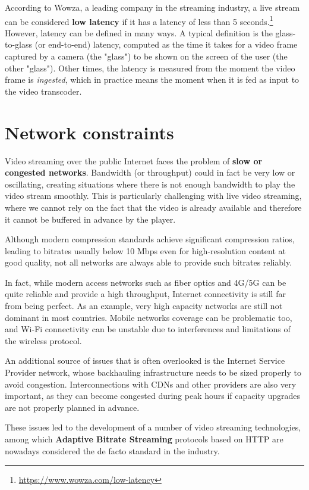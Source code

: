According to Wowza, a leading company in the streaming industry, a live stream can be considered \textbf{low latency} if it has a latency of less than 5 seconds.\footnote{\url{https://www.wowza.com/low-latency}} However, latency can be defined in many ways. A typical definition is the glass-to-glass (or end-to-end) latency, computed as the time it takes for a video frame captured by a camera (the "glass") to be shown on the screen of the user (the other "glass"). Other times, the latency is measured from the moment the video frame is \textit{ingested}, which in practice means the moment when it is fed as input to the video transcoder.

\section{Network constraints}
\label{sec:intro/networks}

Video streaming over the public Internet faces the problem of \textbf{slow or congested networks}. Bandwidth (or throughput) could in fact be very low or oscillating, creating situations where there is not enough bandwidth to play the video stream smoothly. This is particularly challenging with live video streaming, where we cannot rely on the fact that the video is already available and therefore it cannot be buffered in advance by the player.

Although modern compression standards achieve significant compression ratios, leading to bitrates usually below 10 Mbps even for high-resolution content at good quality, not all networks are always able to provide such bitrates reliably.

In fact, while modern access networks such as fiber optics and 4G/5G can be quite reliable and provide a high throughput, Internet connectivity is still far from being perfect. As an example, very high capacity networks are still not dominant in most countries. Mobile networks coverage can be problematic too, and Wi-Fi connectivity can be unstable due to interferences and limitations of the wireless protocol.

An additional source of issues that is often overlooked is the Internet Service Provider network, whose backhauling infrastructure needs to be sized properly to avoid congestion. Interconnections with CDNs and other providers are also very important, as they can become congested during peak hours if capacity upgrades are not properly planned in advance.

These issues led to the development of a number of video streaming technologies, among which \textbf{Adaptive Bitrate Streaming} protocols based on HTTP are nowadays considered the de facto standard in the industry.\cite{bitmovin}

